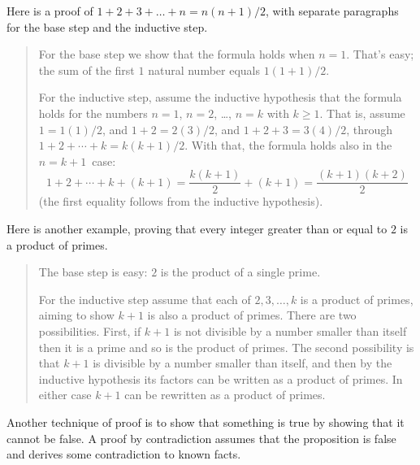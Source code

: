 Here is a proof of \( 1+2+3+\dots+n=n(n+1)/2 \), 
with separate paragraphs for the base step 
and the inductive step.
\begin{quote}\small
For the base step we show that the formula holds when \( n=1 \).
That's easy; the sum of the first \( 1 \) natural number equals 
\( 1(1+1)/2 \).

For the inductive step, assume the inductive hypothesis that the formula holds
for the numbers \( n=1 \), \( n=2 \), \ldots, \( n=k \) with $k\geq 1$.
That is, assume  
$1=1(1)/2$, and $1+2=2(3)/2$, and $1+2+3=3(4)/2$, through  
$1+2+\cdots+k=k(k+1)/2$.
With that, the formula holds also in the \( n=k+1 \)~case:
\begin{equation*}
  1+2+\cdots+k+(k+1)
  =
  \frac{k(k+1)}{2}+(k+1)
  =
  \frac{(k+1)(k+2)}{2}
\end{equation*}
(the first equality follows from the inductive hypothesis).
\end{quote}

Here is another example, proving
that every integer greater than or equal to \( 2 \) is a product
of primes.
\begin{quote}\small
The base step is easy: \( 2 \) is the product of a single prime.

For the inductive step assume that each of \( 2, 3,\ldots ,k \) is a
product of primes, aiming to show \( k+1 \) is also a product of
primes.
There are two possibilities.
First, if \( k+1 \) is not divisible by a number smaller than itself then it
is a prime and so is the product of primes.
The second possibility is that \( k+1 \) is divisible by a number
smaller than itself, and then  by the inductive hypothesis its
factors can be written as a product of primes.
In either case
\( k+1 \) can be rewritten as a product of primes.
\end{quote}





Another technique of proof is
to show that something is true by showing that it cannot be false.
A proof by contradiction assumes that the proposition is
false and derives some contradiction to known facts.

